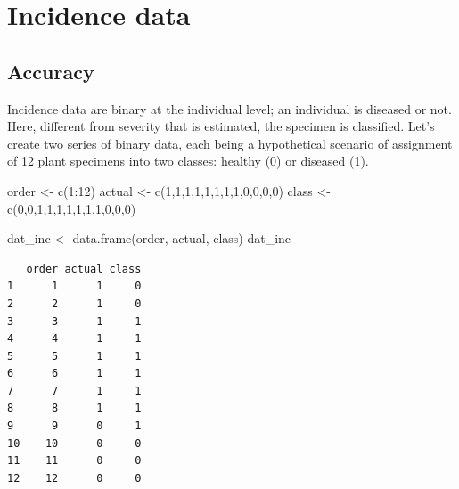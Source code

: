 \documentclass[
  letterpaper,
  DIV=11,
  numbers=noendperiod]{scrreprt}
\newenvironment{Shaded}{\begin{snugshade}}{\end{snugshade}}
\newcommand{\DecValTok}[1]{\textcolor[rgb]{0.68,0.00,0.00}{#1}}
\newcommand{\FunctionTok}[1]{\textcolor[rgb]{0.28,0.35,0.67}{#1}}
\newcommand{\NormalTok}[1]{\textcolor[rgb]{0.00,0.23,0.31}{#1}}
\newcommand{\OtherTok}[1]{\textcolor[rgb]{0.00,0.23,0.31}{#1}}
\newcommand{\SpecialCharTok}[1]{\textcolor[rgb]{0.37,0.37,0.37}{#1}}
\begin{document}
\hypertarget{incidence-data}{%
\chapter{Incidence data}\label{incidence-data}}

\hypertarget{accuracy-1}{%
\section{Accuracy}\label{accuracy-1}}

Incidence data are binary at the individual level; an individual is
diseased or not. Here, different from severity that is estimated, the
specimen is classified. Let's create two series of binary data, each
being a hypothetical scenario of assignment of 12 plant specimens into
two classes: healthy (0) or diseased (1).

\begin{Shaded}
\begin{Highlighting}[]
\NormalTok{order }\OtherTok{\textless{}{-}} \FunctionTok{c}\NormalTok{(}\DecValTok{1}\SpecialCharTok{:}\DecValTok{12}\NormalTok{)}
\NormalTok{actual }\OtherTok{\textless{}{-}} \FunctionTok{c}\NormalTok{(}\DecValTok{1}\NormalTok{,}\DecValTok{1}\NormalTok{,}\DecValTok{1}\NormalTok{,}\DecValTok{1}\NormalTok{,}\DecValTok{1}\NormalTok{,}\DecValTok{1}\NormalTok{,}\DecValTok{1}\NormalTok{,}\DecValTok{1}\NormalTok{,}\DecValTok{0}\NormalTok{,}\DecValTok{0}\NormalTok{,}\DecValTok{0}\NormalTok{,}\DecValTok{0}\NormalTok{)}
\NormalTok{class }\OtherTok{\textless{}{-}} \FunctionTok{c}\NormalTok{(}\DecValTok{0}\NormalTok{,}\DecValTok{0}\NormalTok{,}\DecValTok{1}\NormalTok{,}\DecValTok{1}\NormalTok{,}\DecValTok{1}\NormalTok{,}\DecValTok{1}\NormalTok{,}\DecValTok{1}\NormalTok{,}\DecValTok{1}\NormalTok{,}\DecValTok{1}\NormalTok{,}\DecValTok{0}\NormalTok{,}\DecValTok{0}\NormalTok{,}\DecValTok{0}\NormalTok{)}

\NormalTok{dat\_inc }\OtherTok{\textless{}{-}} \FunctionTok{data.frame}\NormalTok{(order, actual, class)}
\NormalTok{dat\_inc }
\end{Highlighting}
\end{Shaded}

\begin{verbatim}
   order actual class
1      1      1     0
2      2      1     0
3      3      1     1
4      4      1     1
5      5      1     1
6      6      1     1
7      7      1     1
8      8      1     1
9      9      0     1
10    10      0     0
11    11      0     0
12    12      0     0
\end{verbatim}
\end{document}
